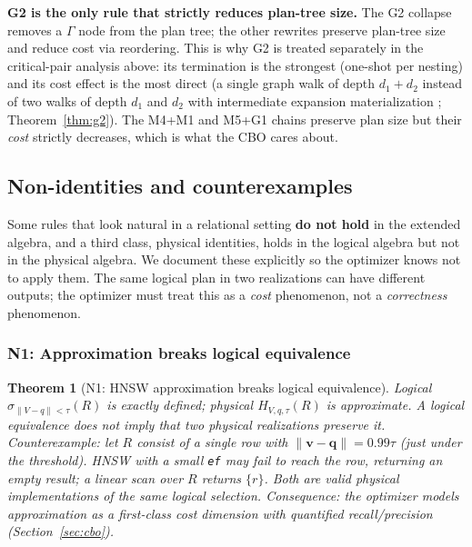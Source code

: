 \documentclass[sigconf]{acmart}
\theoremstyle{plain}
\newtheorem{theorem}{Theorem}
\theoremstyle{definition}
\newcommand{\vect}[1]{\boldsymbol{#1}}
\theoremstyle{remark}
\begin{document}
\noindent\textbf{G2 is the only rule that strictly
reduces plan-tree size.}
The G2 collapse removes a $\Gamma$ node from the
plan tree; the other rewrites preserve plan-tree
size and reduce cost via reordering. This is why
G2 is treated separately in the critical-pair
analysis above: its termination is the strongest
(one-shot per nesting) and its cost effect is the
most direct (a single graph walk of depth
$d_1 + d_2$ instead of two walks of depth $d_1$ and
$d_2$ with intermediate expansion materialization
; Theorem~\ref{thm:g2}). The M4+M1 and M5+G1
chains preserve plan size but their \emph{cost}
strictly decreases, which is what the CBO
cares about.

\subsection{Non-identities and counterexamples}\label{sec:equational:nonident}

Some rules that look natural in a relational setting \textbf{do not
hold} in the extended algebra, and a third class, physical
identities, holds in the logical algebra but not in the physical
algebra. We document these explicitly so the optimizer knows not to
apply them. The same logical plan in two realizations can have
different outputs; the optimizer must treat this as a
\emph{cost} phenomenon, not a \emph{correctness} phenomenon.

\subsubsection{N1: Approximation breaks logical equivalence}

\begin{theorem}[N1: HNSW approximation breaks logical equivalence]\label{thm:n1}
Logical $\sigma_{\lVert V-q\rVert<\tau}(R)$ is exactly defined;
physical $H_{V, q, \tau}(R)$ is \emph{approximate}. A logical
equivalence does not imply that two physical realizations preserve
it. \emph{Counterexample:} let $R$ consist of a single row with
$\lVert \vect{v} - \vect{q} \rVert = 0.99\tau$ (just under the
threshold). HNSW with a small \texttt{ef} may fail to reach the
row, returning an empty result; a linear scan over $R$ returns
$\{r\}$. Both are valid physical implementations of the same
logical selection. \emph{Consequence:} the optimizer models
approximation as a first-class cost dimension with quantified
recall/precision (Section~\ref{sec:cbo}).
\end{theorem}
\end{document}
